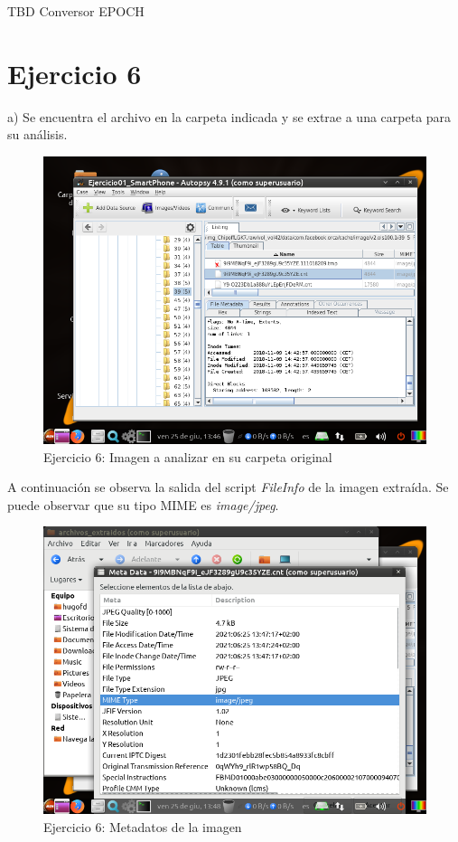 \documentclass[11pt]{article}
\begin{document}
TBD Conversor EPOCH

\section{Ejercicio 6}
a) Se encuentra el archivo en la carpeta indicada y se extrae a una carpeta para su análisis.

\begin{figure}[H]
    \caption{Ejercicio 6: Imagen a analizar en su carpeta original}
    \centering
    \includegraphics[scale=0.7]{e6-1.png}
\end{figure}

A continuación se observa la salida del script \textit{FileInfo} de la imagen extraída. Se puede observar que su tipo MIME es \textit{image/jpeg}.

\begin{figure}[H]
    \caption{Ejercicio 6: Metadatos de la imagen}
    \centering
    \includegraphics[scale=0.7]{e6-2.png}
\end{figure}
\end{document}
